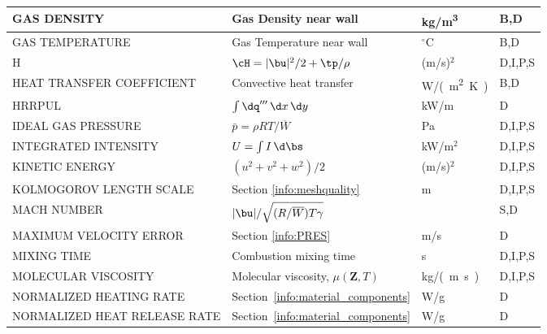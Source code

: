 \documentclass[11pt]{book}
\begin{document}
\begin{longtable}{@{\extracolsep{\fill}}|l|l|l|l|}
{\ct GAS DENSITY}                               & Gas Density near wall                             & \si{kg/m^3}    & B,D          \\ \hline
{\ct GAS TEMPERATURE}                           & Gas Temperature near wall                         & $^\circ$C      & B,D          \\ \hline
{\ct H}                                         & $\cH=|\bu|^2/2 + \tp/\rho    $                    & (m/s)$^2$      & D,I,P,S      \\ \hline
{\ct HEAT TRANSFER COEFFICIENT}                 & Convective heat transfer                          & \si{W/(m^2.K)} & B,D          \\ \hline
{\ct HRRPUL}                                    & $\int \dq''' \, \d x \, \d y$                     & kW/m           & D            \\ \hline
{\ct IDEAL GAS PRESSURE}                        & $\bar{p}=\rho R T / \overline{W}$                 & Pa             & D,I,P,S      \\ \hline
{\ct INTEGRATED INTENSITY}                      & $U=\int I \, \d \bs$                              & kW/m$^2$       & D,I,P,S      \\ \hline
{\ct KINETIC ENERGY}                            & $(u^2+v^2+w^2)/2$                                 & (m/s)$^2$      & D,I,P,S      \\ \hline
{\ct KOLMOGOROV LENGTH SCALE}                   & Section \ref{info:meshquality}                    & m              & D,I,P,S      \\ \hline
{\ct MACH NUMBER}                               & $|\bu|/\sqrt{(R/\overline{W}) T \gamma}$          &                & S,D          \\ \hline
{\ct MAXIMUM VELOCITY ERROR}                    & Section \ref{info:PRES}                           & m/s            & D            \\ \hline
{\ct MIXING TIME}                               & Combustion mixing time                            & s              & D,I,P,S      \\ \hline
{\ct MOLECULAR VISCOSITY}                       & Molecular viscosity, $\mu(\mathbf{Z},T)$          & \si{kg/(m.s)}  & D,I,P,S      \\ \hline
{\ct NORMALIZED HEATING RATE}                   & Section~\ref{info:material_components}            & W/g            & D            \\ \hline
{\ct NORMALIZED HEAT RELEASE RATE}              & Section~\ref{info:material_components}            & W/g            & D            \\ \hline

\end{longtable}
\end{document}
